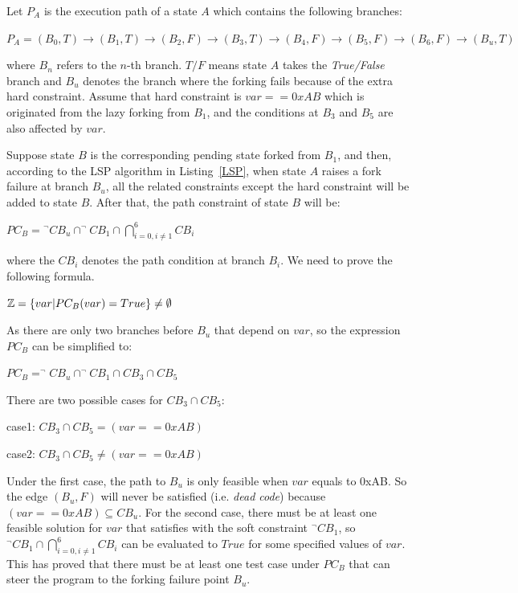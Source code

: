 Let $P_A$ is the execution path of a state $A$ which contains the following branches:
\begin{center}
$P_A = (B_0,T) \rightarrow (B_1,T) \rightarrow (B_2,F) \rightarrow (B_3,T)
\rightarrow (B_4,F) \rightarrow (B_5,F) \rightarrow (B_6,F) \rightarrow (B_u,T)$
\end{center}

\noindent where $B_n$ refers to the $n$-th branch. $T/F$ means state $A$ takes the \emph{True/False} branch and $B_u$ denotes the branch where the forking fails because of the extra hard constraint. Assume that hard constraint is $var==0xAB$ which is originated from the lazy forking from $B_1$, and the conditions at $B_3$ and $B_5$ are also affected by $var$.

Suppose state $B$ is the corresponding pending state forked from $B_1$, and then, according to the LSP algorithm in Listing~\ref{LSP}, when state $A$ raises a fork failure at branch $B_u$, all the related constraints except the hard constraint will be added to state $B$. After that, the path constraint of state $B$ will be:

\begin{center}
$PC_B = \displaystyle ^\neg CB_u \cap ^\neg CB_1 \cap \bigcap\limits_{i=0,i \neq 1}^{6} CB_i$
\end{center}
\noindent where the $CB_i$ denotes the path condition at branch $B_i$. We need to prove the following formula.

\begin{center}
$\mathbb{Z} = \{var\arrowvert PC_B(var) = True\} \neq \emptyset$
\end{center}

As there are only two branches before $B_u$ that depend on $var$, so the expression $PC_B$ can be simplified to:
\begin{center}
$PC_B = ^\neg CB_u \cap ^\neg CB_1 \cap CB_3 \cap CB_5$
\end{center}

There are two possible cases for $CB_3 \cap CB_5$:
\begin{center}
case1: $CB_3 \cap CB_5 = (var == 0xAB)$

case2: $CB_3 \cap CB_5 \neq (var == 0xAB)$
\end{center}

Under the first case, the path to $B_u$ is only feasible when $var$ equals to 0xAB. So the edge $(B_u, F)$ will never be satisfied (i.e. \emph{dead code}) because $(var == 0xAB) \subseteq CB_u$. For the second case, there must be at least one feasible solution for $var$ that satisfies with the soft constraint $^\neg CB_1$, so $^\neg CB_1 \cap \bigcap_{i=0,i \neq 1}^{6} CB_i$ can be evaluated to $True$ for some specified values of $var$. This has proved that there must be at least one test case under $PC_B$ that can steer the program to the forking failure point $B_u$.

